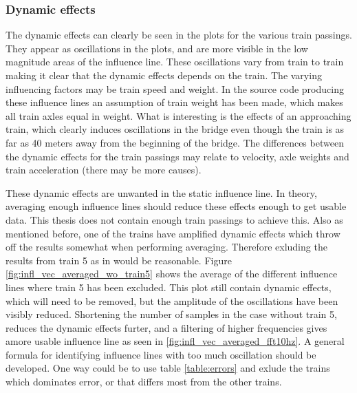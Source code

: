 


\subsubsection{Dynamic effects}
The dynamic effects can clearly be seen in the plots for the various train passings. They appear as oscillations in the plots, and are more visible in the low magnitude areas of the influence line. These oscillations vary from train to train making it clear that the dynamic effects depends on the train. The varying influencing factors may be train speed and weight. In the source code producing these influence lines an assumption of train weight has been made, which makes all train axles equal in weight.
What is interesting is the effects of an approaching train, which clearly induces oscillations in the bridge even though the train is as far as 40 meters away from the beginning of the bridge. The differences between the dynamic effects for the train passings may relate to velocity, axle weights and train acceleration (there may be more causes).

These dynamic effects are unwanted in the static influence line. In theory, averaging enough influence lines should reduce these effects enough to get usable data. This thesis does not contain enough train passings to achieve this. Also as mentioned before, one of the trains have amplified dynamic effects which throw off the results somewhat when performing averaging. Therefore exluding the results from train 5 as in would be reasonable. Figure \ref{fig:infl_vec_averaged_wo_train5} shows the average of the different influence lines where train 5 has been excluded. This plot still contain dynamic effects, which will need to be removed, but the amplitude of the oscillations have been visibly reduced.
Shortening the number of samples in the case without train 5, reduces the dynamic effects furter, and a filtering of higher frequencies gives amore usable influence line as seen in \ref{fig:infl_vec_averaged_fft10hz}.
A general formula for identifying influence lines with too much oscillation should be developed. One way could be to use table \ref{table:errors} and exlude the trains which dominates error, or that differs most from the other trains.

